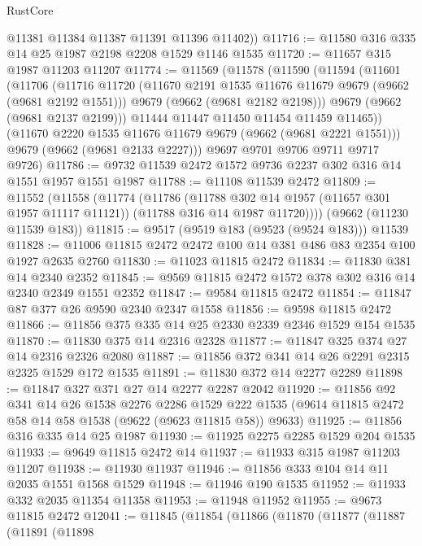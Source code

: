 \begin{lexlean}{RustCore}
\begin{coremodule}
        @11381
        @11384
        @11387
        @11391
        @11396
        @11402))
@11716 := @11580 @316 @335 @14 @25 @1987 @2198 @2208 @1529 @1146 @1535
@11720 := @11657 @315 @1987 @11203 @11207
@11774 := @11569
    (@11578
      (@11590
        (@11594
          (@11601
            (@11706
              (@11716
                @11720
                (@11670 @2191 @1535 @11676 @11679 @9679 (@9662 (@9681 @2192 @1551)))
                @9679
                (@9662 (@9681 @2182 @2198)))
              @9679
              (@9662 (@9681 @2137 @2199)))
            @11444
            @11447
            @11450
            @11454
            @11459
            @11465))
        (@11670 @2220 @1535 @11676 @11679 @9679 (@9662 (@9681 @2221 @1551)))
        @9679
        (@9662 (@9681 @2133 @2227)))
      @9697
      @9701
      @9706
      @9711
      @9717
      @9726)
@11786 := @9732 @11539 @2472 @1572 @9736 @2237 @302 @316 @14 @1551 @1957 @1551 @1987
@11788 := @11108 @11539 @2472
@11809 := @11552
    (@11558
      (@11774
        (@11786
          (@11788 @302 @14 @1957 (@11657 @301 @1957 @11117 @11121))
          (@11788 @316 @14 @1987 @11720))))
    (@9662 (@11230 @11539 @183))
@11815 := @9517 (@9519 @183 (@9523 (@9524 @183))) @11539
@11828 := @11006 @11815 @2472 @2472 @100 @14 @381 @486 @83 @2354 @100 @1927 @2635 @2760
@11830 := @11023 @11815 @2472
@11834 := @11830 @381 @14 @2340 @2352
@11845 := @9569 @11815 @2472 @1572 @378 @302 @316 @14 @2340 @2349 @1551 @2352
@11847 := @9584 @11815 @2472
@11854 := @11847 @87 @377 @26 @9590 @2340 @2347 @1558
@11856 := @9598 @11815 @2472
@11866 := @11856 @375 @335 @14 @25 @2330 @2339 @2346 @1529 @154 @1535
@11870 := @11830 @375 @14 @2316 @2328
@11877 := @11847 @325 @374 @27 @14 @2316 @2326 @2080
@11887 := @11856 @372 @341 @14 @26 @2291 @2315 @2325 @1529 @172 @1535
@11891 := @11830 @372 @14 @2277 @2289
@11898 := @11847 @327 @371 @27 @14 @2277 @2287 @2042
@11920 := @11856
    @92
    @341
    @14
    @26
    @1538
    @2276
    @2286
    @1529
    @222
    @1535
    (@9614 @11815 @2472 @58 @14 @58 @1538 (@9622 (@9623 @11815 @58)) @9633)
@11925 := @11856 @316 @335 @14 @25 @1987
@11930 := @11925 @2275 @2285 @1529 @204 @1535
@11933 := @9649 @11815 @2472 @14
@11937 := @11933 @315 @1987 @11203 @11207
@11938 := @11930 @11937
@11946 := @11856 @333 @104 @14 @11 @2035 @1551 @1568 @1529
@11948 := @11946 @190 @1535
@11952 := @11933 @332 @2035 @11354 @11358
@11953 := @11948 @11952
@11955 := @9673 @11815 @2472
@12041 := @11845
    (@11854
      (@11866
        (@11870
          (@11877
            (@11887
              (@11891
                (@11898

\end{coremodule}
\end{lexlean}
